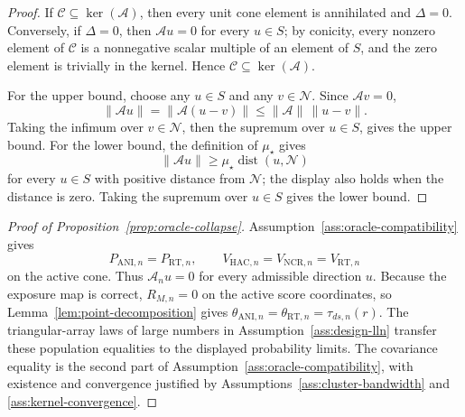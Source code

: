 \documentclass[11pt]{article}
\theoremstyle{definition}
\theoremstyle{plain}
\theoremstyle{remark}
\begin{document}
\begin{proof}
If \(\mathcal C\subseteq\ker(\mathcal A)\), then every unit cone element is
annihilated and \(\Delta=0\).  Conversely, if \(\Delta=0\), then
\(\mathcal A u=0\) for every \(u\in S\); by conicity, every nonzero element of
\(\mathcal C\) is a nonnegative scalar multiple of an element of \(S\), and
the zero element is trivially in the kernel.  Hence
\(\mathcal C\subseteq\ker(\mathcal A)\).

For the upper bound, choose any \(u\in S\) and any \(v\in\mathcal N\).  Since
\(\mathcal A v=0\),
\[
  \|\mathcal A u\|=\|\mathcal A(u-v)\|
  \le \|\mathcal A\|\,\|u-v\|.
\]
Taking the infimum over \(v\in\mathcal N\), then the supremum over
\(u\in S\), gives the upper bound.  For the lower bound, the definition of
\(\mu_\star\) gives
\[
  \|\mathcal A u\|
  \ge
  \mu_\star\operatorname{dist}(u,\mathcal N)
\]
for every \(u\in S\) with positive distance from \(\mathcal N\); the display
also holds when the distance is zero.  Taking the supremum over \(u\in S\)
gives the lower bound.
\end{proof}

\begin{proof}[Proof of Proposition~\ref{prop:oracle-collapse}]
Assumption~\ref{ass:oracle-compatibility} gives
\[
  P_{\mathrm{ANI},n}=P_{\mathrm{RT},n},
  \qquad
  V_{\mathrm{HAC},n}=V_{\mathrm{NCR},n}=V_{\mathrm{RT},n}
\]
on the active cone.  Thus \(\mathcal A_nu=0\) for every admissible direction
\(u\).  Because the exposure map is correct, \(R_{M,n}=0\) on the active
score coordinates, so Lemma~\ref{lem:point-decomposition} gives
\(\theta_{\mathrm{ANI},n}=\theta_{\mathrm{RT},n}=\tau_{ds,n}(r)\).  The
triangular-array laws of large numbers in Assumption~\ref{ass:design-lln}
transfer these population equalities to the displayed probability limits.
The covariance equality is the second part of
Assumption~\ref{ass:oracle-compatibility}, with existence and convergence
justified by Assumptions~\ref{ass:cluster-bandwidth} and
\ref{ass:kernel-convergence}.
\end{proof}
\end{document}
